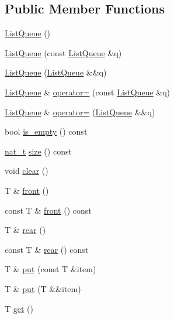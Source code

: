 \subsection*{Public Member Functions}
\begin{DoxyCompactItemize}
\item 
\hyperlink{class_designar_1_1_list_queue_a873b7115c57ffc8b3bb812df2727041f}{List\+Queue} ()
\item 
\hyperlink{class_designar_1_1_list_queue_aa7539c8b5a199916b2013ea4072eac38}{List\+Queue} (const \hyperlink{class_designar_1_1_list_queue}{List\+Queue} \&q)
\item 
\hyperlink{class_designar_1_1_list_queue_a959df61146e0642a0ee24227b257e470}{List\+Queue} (\hyperlink{class_designar_1_1_list_queue}{List\+Queue} \&\&q)
\item 
\hyperlink{class_designar_1_1_list_queue}{List\+Queue} \& \hyperlink{class_designar_1_1_list_queue_aed4d7cad2e706202054746bf4f934903}{operator=} (const \hyperlink{class_designar_1_1_list_queue}{List\+Queue} \&q)
\item 
\hyperlink{class_designar_1_1_list_queue}{List\+Queue} \& \hyperlink{class_designar_1_1_list_queue_ae0ee7a8cf8b7cbf8f89a268db1a448dc}{operator=} (\hyperlink{class_designar_1_1_list_queue}{List\+Queue} \&\&q)
\item 
bool \hyperlink{class_designar_1_1_list_queue_a0d21739ee62997c7b7a35fb7583e1629}{is\+\_\+empty} () const
\item 
\hyperlink{namespace_designar_aa72662848b9f4815e7bf31a7cf3e33d1}{nat\+\_\+t} \hyperlink{class_designar_1_1_list_queue_a0a2d3a25c27b0529b1bcc4b0c0b27855}{size} () const
\item 
void \hyperlink{class_designar_1_1_list_queue_aaca43c7f4dc964e05e5bb4af01efc389}{clear} ()
\item 
T \& \hyperlink{class_designar_1_1_list_queue_aa7fc9ba1a7fb8e65819be9da7f96e106}{front} ()
\item 
const T \& \hyperlink{class_designar_1_1_list_queue_abfc6bf50f4b4158e735ccd2c2d49ab1b}{front} () const
\item 
T \& \hyperlink{class_designar_1_1_list_queue_a04064adf41dec656de3dfa66a72c9f22}{rear} ()
\item 
const T \& \hyperlink{class_designar_1_1_list_queue_af3e54cd6e13b28f49dde38881f0a737f}{rear} () const
\item 
T \& \hyperlink{class_designar_1_1_list_queue_aff798fc666bdf94771a60fa291f12a5e}{put} (const T \&item)
\item 
T \& \hyperlink{class_designar_1_1_list_queue_a6a8469ab0fc0ddc5e01a067374772ac2}{put} (T \&\&item)
\item 
T \hyperlink{class_designar_1_1_list_queue_a4b934d649cd814fff5ec643843b8245d}{get} ()
\end{DoxyCompactItemize}


